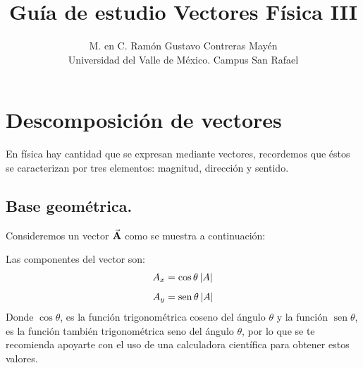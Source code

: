 \documentclass[14pt]{extarticle}
\title{\vspace*{-2cm} Guía de estudio Vectores  Física III}
\author{M. en C. Ramón Gustavo Contreras Mayén \\ {\fontsize{14}{14}\selectfont Universidad del Valle de México. Campus San Rafael}}
\date{}
\renewcommand{\sin}{\operatorname{sen}}
\begin{document}
\maketitle

\section{Descomposición de vectores}

En física hay cantidad que se expresan mediante vectores, recordemos que éstos se caracterizan por tres elementos: magnitud, dirección y sentido.

\subsection{Base geométrica.}

Consideremos un vector $\va{A}$ como se muestra a continuación:
\begin{figure}[H]
    \centering
\end{figure}

Las componentes del vector son:
\begin{align*}
A_{x} &= \cos \theta \, \abs{A} \\[0.5em] 
A_{y} &= \sin \theta \, \abs{A}
\end{align*}
Donde $\cos \theta$, es la función trigonométrica coseno del ángulo $\theta$ y la función $\sin \theta$, es la función también trigonométrica seno del ángulo $\theta$, por lo que se te recomienda apoyarte con el uso de una calculadora científica para obtener estos valores.

\end{document}

